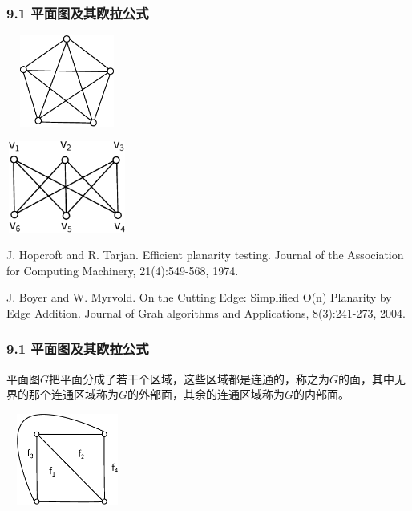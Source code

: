 \documentclass{beamer}
\begin{document}
\begin{CJK}{UTF8}{gbsn}
\begin{frame}
  \frametitle{9.1 平面图及其欧拉公式}
  \begin{minipage}{0.45\linewidth}
\includegraphics[width=4cm,height=3cm]{k5}    
  \end{minipage}
\pause
  \begin{minipage}{0.45\linewidth}
    \includegraphics[width=4cm,height=3cm]{k33}
  \end{minipage}
\pause
  \begin{thebibliography}{99}
  J. Hopcroft and R. Tarjan.
\newblock Efficient planarity testing.
\newblock Journal of the Association for Computing Machinery, 21(4):549-568, 1974.
  \end{thebibliography}
\pause
  \begin{thebibliography}{99}
  J. Boyer and W. Myrvold.
\newblock On the Cutting Edge: Simplified O(n) Planarity by Edge Addition.
\newblock Journal of Grah algorithms and Applications, 8(3):241-273, 2004.
  \end{thebibliography}
\end{frame}
\begin{frame}
  \frametitle{9.1 平面图及其欧拉公式}
  \begin{Def}
    平面图$G$把平面分成了若干个区域，这些区域都是连通的，称之为$G$的\alert{面}，其中无界的那个连通区域称为$G$的\alert{外部面}，其余的连通区域称为$G$的\alert{内部面}。
  \end{Def}    
  \includegraphics[width=4cm,height=3cm]{face}

\end{frame}
\end{CJK}
\end{document}
